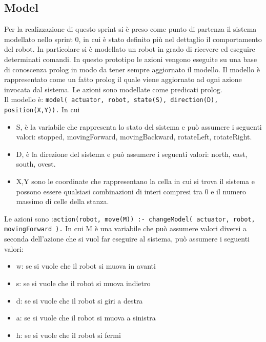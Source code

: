 \subsection{Model}

Per la realizzazione di questo sprint si è preso come punto di partenza il sistema modellato nello sprint 0, in cui è stato definito più nel dettaglio il comportamento del robot. In particolare si è modellato un robot in grado di ricevere ed eseguire determinati comandi. In questo prototipo le azioni vengono eseguite su una base di conoscenza prolog in modo da tener sempre aggiornato il modello. Il modello è rappresentato come un fatto prolog il quale viene aggiornato ad ogni azione invocata dal sistema. Le azioni sono modellate come predicati prolog.
\\Il modello è: \lstinline {model( actuator, robot, state(S), direction(D), position(X,Y)).} In cui 
\begin{itemize}
    \item S, è la variabile che rappresenta lo stato del sistema e può assumere i seguenti valori: stopped, movingForward, movingBackward, rotateLeft, rotateRight.
    \item D, è la direzione del sistema e può assumere i seguenti valori: north, east, south, ovest.
    \item X,Y sono le coordinate che rappresentano la cella in cui si trova il sistema e possono essere qualsiasi combinazioni di interi compresi tra 0 e il numero massimo di celle della stanza.
\end{itemize}

Le azioni sono :\lstinline {action(robot, move(M)) :- changeModel( actuator, robot, movingForward ).} In cui M è una variabile che può assumere valori diversi a seconda dell'azione che si vuol far eseguire al sistema, può assumere i seguenti valori:
\begin{itemize}
    \item w: se si vuole che il robot si muova in avanti
    \item s: se si vuole che il robot si muova indietro
    \item d: se si vuole che il robot si giri a destra
    \item a: se si vuole che il robot si muova a sinistra
    \item h: se si vuole che il robot si fermi
\end{itemize}

\noindent


